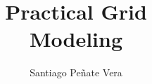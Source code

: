 \documentclass{tufte-book}
\title{Practical Grid\\Modeling}
\author[]{Santiago Pe\~nate Vera}
\newcommand{\monthyear}{%
  \ifcase\month\or January\or February\or March\or April\or May\or June\or
  July\or August\or September\or October\or November\or
  December\fi\space\number\year
}
\newcommand{\openepigraph}[2]{%
  \begin{fullwidth}
  \sffamily\large
  \begin{doublespace}
  \noindent\allcaps{#1}\\%
  \noindent\allcaps{#2}%
  \end{doublespace}
  \end{fullwidth}
}
\newcommand{\blankpage}{\newpage\hbox{}\thispagestyle{empty}\newpage}
\begin{document}
\frontmatter




\maketitle

\doclicenseThis

\newpage
%
%
%
%
\end{document}
